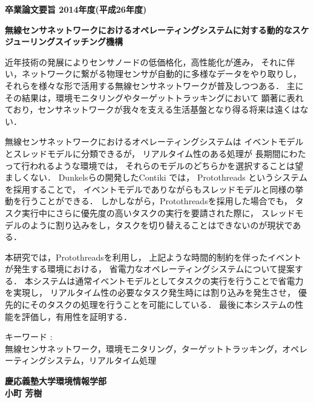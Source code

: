 \begin{center}
\textbf{\Large 卒業論文要旨 2014年度(平成26年度)}

\vspace{6.18mm}

\textbf{\Large 無線センサネットワークにおけるオペレーティングシステムに対する動的なスケジューリングスイッチング機構}
\end{center}

\vspace{10mm}
近年技術の発展によりセンサノードの低価格化，高性能化が進み，
それに伴い，ネットワークに繋がる物理センサが自動的に多様なデータをやり取りし，
それらを様々な形で活用する無線センサネットワークが普及しつつある．
主にその結果は，環境モニタリングやターゲットトラッキングにおいて
顕著に表れており，センサネットワークが我々を支える生活基盤となり得る将来は遠くはない．

無線センサネットワークにおけるオペレーティングシステムは
イベントモデルとスレッドモデルに分類できるが，
リアルタイム性のある処理が
長期間にわたって行われるような環境では，
それらのモデルのどちらかを選択することは望ましくない．
Dunkelsらの開発したContiki\cite{Dunkels:2004:CLF:1032658.1034117}
では，
Protothreads\cite{Dunkels:2006:PSE:1182807.1182811}
というシステムを採用することで，
イベントモデルでありながらもスレッドモデルと同様の挙動を行うことができる．
しかしながら，Protothreadsを採用した場合でも，
タスク実行中にさらに優先度の高いタスクの実行を要請された際に，
スレッドモデルのように割り込みをし，タスクを切り替えることはできないのが現状である．

本研究では，Protothreadsを利用し，
上記ような時間的制約を伴ったイベントが発生する環境における，
省電力なオペレーティングシステムについて提案する．
本システムは通常イベントモデルとしてタスクの実行を行うことで省電力を実現し，
リアルタイム性の必要なタスク発生時には割り込みを発生させ，
優先的にそのタスクの処理を行うことを可能にしている．
最後に本システムの性能を評価し，有用性を証明する．


\vspace{10mm}
キーワード :\\
\hspace{3.5em}無線センサネットワーク，環境モニタリング，ターゲットトラッキング，オペレーティングシステム，リアルタイム処理

\begin{flushright}
\textbf{慶応義塾大学環境情報学部}\\
\textbf{小町 芳樹}
\end{flushright}

